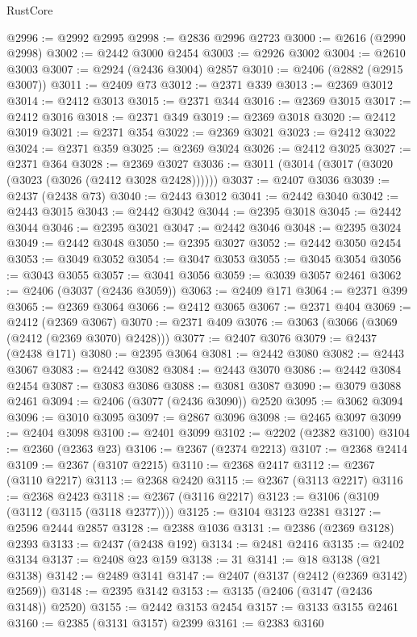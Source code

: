 \begin{lexlean}{RustCore}
\begin{coremodule}
@2996 := @2992 @2995
@2998 := @2836 @2996 @2723
@3000 := @2616 (@2990 @2998)
@3002 := @2442 @3000 @2454
@3003 := @2926 @3002
@3004 := @2610 @3003
@3007 := @2924 (@2436 @3004) @2857
@3010 := @2406 (@2882 (@2915 @3007))
@3011 := @2409 @73
@3012 := @2371 @339
@3013 := @2369 @3012
@3014 := @2412 @3013
@3015 := @2371 @344
@3016 := @2369 @3015
@3017 := @2412 @3016
@3018 := @2371 @349
@3019 := @2369 @3018
@3020 := @2412 @3019
@3021 := @2371 @354
@3022 := @2369 @3021
@3023 := @2412 @3022
@3024 := @2371 @359
@3025 := @2369 @3024
@3026 := @2412 @3025
@3027 := @2371 @364
@3028 := @2369 @3027
@3036 := @3011 (@3014 (@3017 (@3020 (@3023 (@3026 (@2412 @3028 @2428))))))
@3037 := @2407 @3036
@3039 := @2437 (@2438 @73)
@3040 := @2443 @3012
@3041 := @2442 @3040
@3042 := @2443 @3015
@3043 := @2442 @3042
@3044 := @2395 @3018
@3045 := @2442 @3044
@3046 := @2395 @3021
@3047 := @2442 @3046
@3048 := @2395 @3024
@3049 := @2442 @3048
@3050 := @2395 @3027
@3052 := @2442 @3050 @2454
@3053 := @3049 @3052
@3054 := @3047 @3053
@3055 := @3045 @3054
@3056 := @3043 @3055
@3057 := @3041 @3056
@3059 := @3039 @3057 @2461
@3062 := @2406 (@3037 (@2436 @3059))
@3063 := @2409 @171
@3064 := @2371 @399
@3065 := @2369 @3064
@3066 := @2412 @3065
@3067 := @2371 @404
@3069 := @2412 (@2369 @3067)
@3070 := @2371 @409
@3076 := @3063 (@3066 (@3069 (@2412 (@2369 @3070) @2428)))
@3077 := @2407 @3076
@3079 := @2437 (@2438 @171)
@3080 := @2395 @3064
@3081 := @2442 @3080
@3082 := @2443 @3067
@3083 := @2442 @3082
@3084 := @2443 @3070
@3086 := @2442 @3084 @2454
@3087 := @3083 @3086
@3088 := @3081 @3087
@3090 := @3079 @3088 @2461
@3094 := @2406 (@3077 (@2436 @3090)) @2520
@3095 := @3062 @3094
@3096 := @3010 @3095
@3097 := @2867 @3096
@3098 := @2465 @3097
@3099 := @2404 @3098
@3100 := @2401 @3099
@3102 := @2202 (@2382 @3100)
@3104 := @2360 (@2363 @23)
@3106 := @2367 (@2374 @2213)
@3107 := @2368 @2414
@3109 := @2367 (@3107 @2215)
@3110 := @2368 @2417
@3112 := @2367 (@3110 @2217)
@3113 := @2368 @2420
@3115 := @2367 (@3113 @2217)
@3116 := @2368 @2423
@3118 := @2367 (@3116 @2217)
@3123 := @3106 (@3109 (@3112 (@3115 (@3118 @2377))))
@3125 := @3104 @3123 @2381
@3127 := @2596 @2444 @2857
@3128 := @2388 @1036
@3131 := @2386 (@2369 @3128) @2393
@3133 := @2437 (@2438 @192)
@3134 := @2481 @2416
@3135 := @2402 @3134
@3137 := @2408 @23 @159
@3138 := 31
@3141 := @18 @3138 (@21 @3138)
@3142 := @2489 @3141
@3147 := @2407 (@3137 (@2412 (@2369 @3142) @2569))
@3148 := @2395 @3142
@3153 := @3135 (@2406 (@3147 (@2436 @3148)) @2520)
@3155 := @2442 @3153 @2454
@3157 := @3133 @3155 @2461
@3160 := @2385 (@3131 @3157) @2399
@3161 := @2383 @3160

\end{coremodule}
\end{lexlean}
